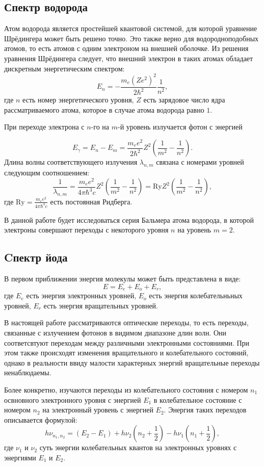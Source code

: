 \subsection{Спектр водорода}
Атом водорода является простейшей квантовой системой, для которой уравнение
Шрёдингера может быть решено точно. Это также верно для водородноподобных
атомов, то есть атомов с одним электроном на внешней оболочке. Из решения
уравнения Шрёдингера следует, что внешний электрон в таких атомах обладает
дискретным энергетическим спектром:
\[
  E_n = - \frac{m_e \left(Z e^2\right)^2}{2\hbar^2}\frac{1}{n^2},
\]
где $n$ есть номер энергетического уровня, $Z$ есть зарядовое число ядра
рассматриваемого атома, которое в случае атома водорода равно $1$.

При переходе электрона с $n$-го на $m$-й уровень излучается фотон с энергией

\[
	E_\gamma = E_n - E_m = \frac{m_ee^2}{2\hbar^2}Z^2\left(\frac{1}{m^2} - \frac{1}{n^2}\right).
\]
Длина волны  соответствующего излучения $\lambda_{n,m}$ связана с номерами
уровней следующим соотношением:
\begin{equation}\label{eq::ry}
  \frac{1}{\lambda_{n,m}} =\frac{m_ee^2}{4\pi\hbar^3c}Z^2\left(\frac{1}{m^2}-\frac{1}{n^2}\right) = \text{Ry} Z^2 \left(\frac{1}{m^2}-\frac{1}{n^2}\right),
\end{equation}
где $\text{Ry} = \frac{m_ee^2}{4\pi\hbar^3c}$ есть постоянная Ридберга.

В данной работе будет исследоваться серия Бальмера атома водорода, в которой
электроны совершают переходы с некоторого уровня $n$ на уровень $m = 2$.

\subsection{Cпектр йода}
В первом приближении энергия молекулы может быть представлена в виде:
\[
  E = E_e + E_o + E_r,
\]
где $E_e$ есть энергия электронных уровней, $E_o$ есть энергия колебательньных
уровней, $E_r$ есть энергия вращательных уровней.

В настоящей работе рассматриваются оптические переходы, то есть переходы,
связанные с излучением фотонов в видимом диапазоне длин волн. Они соответсвтуют
переходам между различными электронными состояниями. При этом также происходят
изменения вращательного и колебательного состояний, однако в реальности ввиду
малости характерных энергий вращательные переходы ненаблюдаемы.

Более конкретно, изучаются переходы из колебательного состояния с номером $n_1$
освновного электронного уровня с энергией $E_1$ в колебательное состояние с
номером $n_2$ на электронный уровень с энергией $E_2$. Энергия таких переходов
описывается формулой:
\[
  h \nu_{n_1,n_2}=(E_2-E_1)+h\nu_2
  \left(n_2+\frac{1}{2}\right)-h \nu_1\left(n_1+\frac{1}{2}\right),
\]
где $\nu_1$ и $\nu_2$ суть энергии колебательных квантов на электронных уровнях с энергиями $E_1$ и $E_2$.

